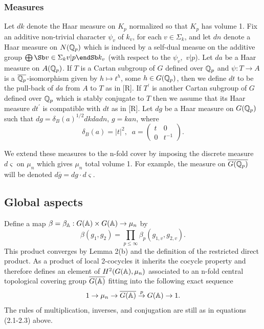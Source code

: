 \subsubsection{Measures}

Let $dk$ denote the Haar measure on $K_p$ normalized so that $K_p$ has
volume 1. Fix an additive non-trivial character $\psi _v$ of $k_v$, for each$%
\;v\in \Sigma _k$, and let $dn$ denote a Haar measure on $N({\Bbb{Q}}_p)$
which is induced by a self-dual measue on the additive group $\bigoplus\Sb %
v\in \Sigma _k  \\ v|p  \endSb k_v$ (with respect to the $\psi _v,$ $v|p$).
Let $da$ be a Haar measure on $A({\Bbb{Q}}_p)$. If $T$ is a Cartan subgroup of 
$G$ defined over ${\Bbb{Q}}_p$ and $\psi :T\rightarrow A$ is a $\overline{\Bbb{%
Q}_p}$-isomorphism given by $h\longmapsto t^h$, some $h\in G({\Bbb{Q}}_p)$,
then we define $dt$ to be the pull-back of $da$ from $A$ to $T$ as in [R].
If $T^{\prime }$ is another Cartan subgroup of $G$ defined over ${\Bbb{Q}}_p$
which is stably conjugate to $T$ then we assume that its Haar measure
$dt^{\prime }$ is compatible with $dt$ as in [R]. Let $dg$ be a Haar measure
on $G({\Bbb{Q}}_p)$ such that $dg=\delta _B(a)^{1/2}dkdadn$, $g=kan$, where 
\begin{equation}
\delta _B(a)=|t|^2,\;\;a=\left( 
\begin{array}{cc}
t & 0 \\ 
0 & t^{-1}
\end{array}
\right) .
\end{equation}

We extend these measures to the n-fold cover by imposing the discrete
measure $d\varsigma $ on $\mu _n$ which gives $\mu _n$ total volume 1. For
example, the measure on $\overline{G({\Bbb{Q}}_p)}$ will be denoted $d%
\overline{g}=dg\cdot d\varsigma $.

\subsection{Global aspects}

Define a map $\beta =\beta _{{\Bbb{A}}}:G({\Bbb{A}})\times G({\Bbb{A}})\rightarrow
\mu _n$ by 
\[
\beta (g_1,g_2)=\prod_{p\leq \infty }\beta _p(g_{1,v},g_{2,v}).
\]
This product converges by Lemma 2(b) and the definition of the restricted
direct product. As a product of local 2-cocycles it inherits the cocycle
property and therefore defines an element of $H^2(G({\Bbb{A}}),\mu _n)$
associated to an n-fold central topological covering group $\overline{G(\Bbb{%
A})}$ fitting into the following exact sequence 
\begin{equation}
1\rightarrow \mu _n\rightarrow \overline{G({\Bbb{A}})}\stackrel{p}{\rightarrow 
}G({\Bbb{A}})\rightarrow 1.
\end{equation}
The rules of multiplication, inverses, and conjugation are still as in
equations (2.1-2.3) above.

